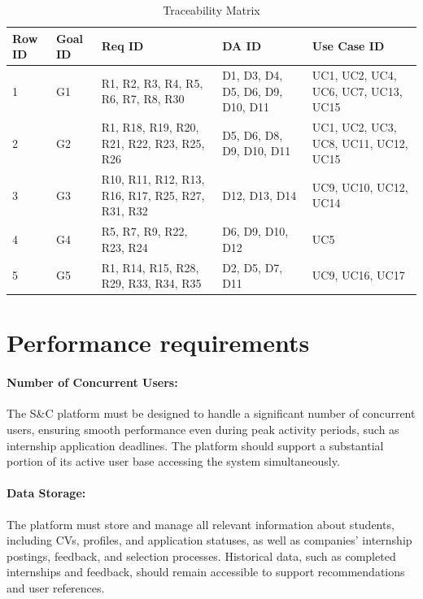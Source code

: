 \begin{table}[htbp]
    \centering
    \renewcommand{\arraystretch}{1.5}
    \begin{tabularx}{\textwidth}{|l|l|X|X|X|}
        \hline
        \textbf{Row ID} & \textbf{Goal ID} & \textbf{Req ID} & \textbf{DA ID} & \textbf{Use Case ID} \\
        \hline
        1 & G1 & R1, R2, R3, R4, R5, R6, R7, R8, R30 & D1, D3, D4, D5, D6, D9, D10, D11 & UC1, UC2, UC4, UC6, UC7, UC13, UC15\\
        \hline
        2 & G2 & R1, R18, R19, R20, R21, R22, R23, R25, R26 & D5, D6, D8, D9, D10, D11 & UC1, UC2, UC3, UC8, UC11, UC12, UC15\\
        \hline
        3 & G3 & R10, R11, R12, R13, R16, R17, R25, R27, R31, R32 & D12, D13, D14 & UC9, UC10, UC12, UC14\\
        \hline
        4 & G4 & R5, R7, R9, R22, R23, R24 & D6, D9, D10, D12 & UC5\\
        \hline
        5 & G5 & R1, R14, R15, R28, R29, R33, R34, R35 & D2, D5, D7, D11 & UC9, UC16, UC17\\
        \hline
    \end{tabularx}
    \caption{Traceability Matrix}
    \label{tab:tracebility_matrix}
\end{table}



\newpage

\section{Performance requirements}
\label{sec:performance_requirements}%


\paragraph{Number of Concurrent Users:}
  The S\&C platform must be designed to handle a significant number of
  concurrent users, ensuring smooth performance even during peak
  activity periods, such as internship application deadlines. The
  platform should support a substantial portion of its active user base
  accessing the system simultaneously.
\paragraph{Data Storage:}
  The platform must store and manage all relevant information about
  students, including CVs, profiles, and application statuses, as well
  as companies' internship postings, feedback, and selection processes.
  Historical data, such as completed internships and feedback, should
  remain accessible to support recommendations and user references.
